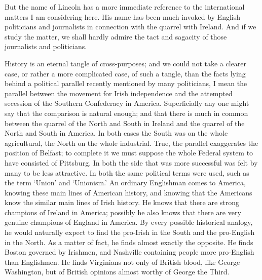\documentclass{book}
\begin{document}
But the name of Lincoln has a more immediate reference to the international matters I am considering here. His name has been much invoked by English politicians and journalists in connection with the quarrel with Ireland. And if we study the matter, we shall hardly admire the tact and sagacity of those journalists and politicians.

History is an eternal tangle of cross-purposes; and we could not take a clearer case, or rather a more complicated case, of such a tangle, than the facts lying behind a political parallel recently mentioned by many politicians, I mean the parallel between the movement for Irish independence and the attempted secession of the Southern Confederacy in America. Superficially any one might say that the comparison is natural enough; and that there is much in common between the quarrel of the North and South in Ireland and the quarrel of the North and South in America. In both cases the South was on the whole agricultural, the North on the whole industrial. True, the parallel exaggerates the position of Belfast; to complete it we must suppose the whole Federal system to have consisted of Pittsburg. In both the side that was more successful was felt by many to be less attractive. In both the same political terms were used, such as the term ‘Union’ and ‘Unionism.’ An ordinary Englishman comes to America, knowing these main lines of American history, and knowing that the Americans know the similar main lines of Irish history. He knows that there are strong champions of Ireland in America; possibly he also knows that there are very genuine champions of England in America. By every possible historical analogy, he would naturally expect to find the pro-Irish in the South and the pro-English in the North. As a matter of fact, he finds almost exactly the opposite. He finds Boston governed by Irishmen, and Nashville containing people more pro-English than Englishmen. He finds Virginians not only of British blood, like George Washington, but of British opinions almost worthy of George the Third.
\end{document}
